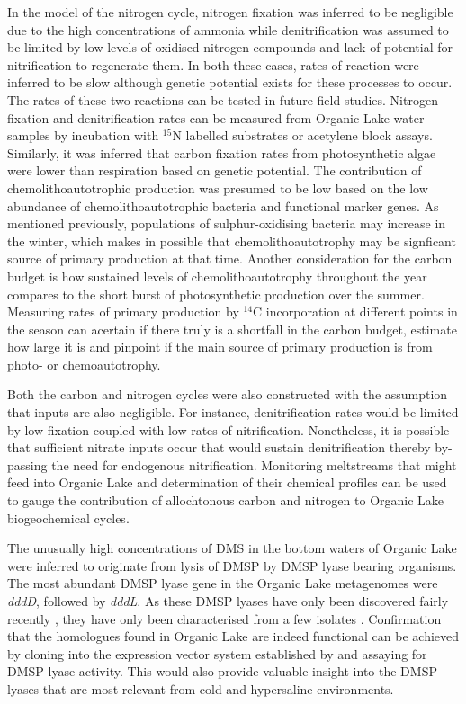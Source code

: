 In the model of the nitrogen cycle, nitrogen fixation was inferred to be negligible due to the high concentrations of ammonia while denitrification was assumed to be limited by low levels of oxidised nitrogen compounds and lack of potential for nitrification to regenerate them.
In both these cases, rates of reaction were inferred to be slow although genetic potential exists for these processes to occur.
The rates of these two reactions can be tested in future field studies.
Nitrogen fixation and denitrification rates can be measured from Organic Lake water samples by incubation with $^{15}$N labelled substrates or acetylene block assays.
Similarly, it was inferred that carbon fixation rates from photosynthetic algae were lower than respiration based on genetic potential.
The contribution of chemolithoautotrophic production was presumed to be low based on the low abundance of chemolithoautotrophic bacteria and functional marker genes. 
As mentioned previously, populations of sulphur-oxidising bacteria may increase in the winter, which makes in possible that chemolithoautotrophy may be signficant source of primary production at that time.
Another consideration for the carbon budget is how sustained levels of chemolithoautotrophy throughout the year compares to the short burst of photosynthetic production over the summer.
Measuring rates of primary production by $^{14}$C incorporation at different points in the season can acertain if there truly is a shortfall in the carbon budget, estimate how large it is and pinpoint if the main source of primary production is from photo- or chemoautotrophy.

Both the carbon and nitrogen cycles were also constructed with the assumption that inputs are also negligible.
For instance, denitrification rates would be limited by low fixation coupled with low rates of nitrification.
Nonetheless, it is possible that sufficient nitrate inputs occur that would sustain denitrification thereby by-passing the need for endogenous nitrification.
Monitoring meltstreams that might feed into Organic Lake and determination of their chemical profiles can be used to gauge the contribution of allochtonous carbon and nitrogen to Organic Lake biogeochemical cycles.

The unusually high concentrations of \ac{DMS} in the bottom waters of Organic Lake were inferred to originate from lysis of \ac{DMSP} by \ac{DMSP} lyase bearing organisms.
The most abundant \ac{DMSP} lyase gene in the Organic Lake metagenomes were \emph{dddD}, followed by \emph{dddL}.
As these \ac{DMSP} lyases have only been discovered fairly recently \cite{Todd2007, Curson2008}, they have only been characterised from a few isolates \cite{Todd2007, Curson2008, Curson2010, Todd2010, Curson2012}.
Confirmation that the homologues found in Organic Lake are indeed functional can be achieved by cloning into the expression vector system established by \citet{Todd2007} and assaying for \ac{DMSP} lyase activity.
This would also provide valuable insight into the \ac{DMSP} lyases that are most relevant from cold and hypersaline environments.

